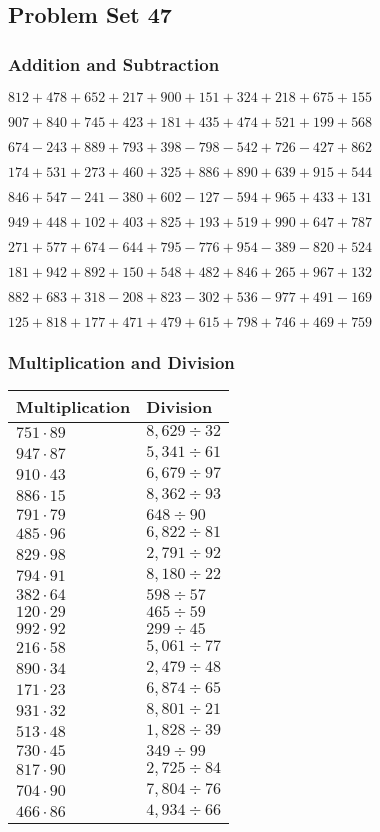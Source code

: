 \hypertarget{problem-set-47-1}{%
\subsection{Problem Set 47}\label{problem-set-47-1}}

\hypertarget{addition-and-subtraction-147}{%
\subsubsection{Addition and
Subtraction}\label{addition-and-subtraction-147}}

\(812 + 478 + 652 + 217 + 900 + 151 + 324 + 218 + 675 + 155\)

\(907 + 840 + 745 + 423 + 181 + 435 + 474 + 521 + 199 + 568\)

\(674 - 243 + 889 + 793 + 398 - 798 - 542 + 726 - 427 + 862\)

\(174 + 531 + 273 + 460 + 325 + 886 + 890 + 639 + 915 + 544\)

\(846 + 547 - 241 - 380 + 602 - 127 - 594 + 965 + 433 + 131\)

\(949 + 448 + 102 + 403 + 825 + 193 + 519 + 990 + 647 + 787\)

\(271 + 577 + 674 - 644 + 795 - 776 + 954 - 389 - 820 + 524\)

\(181 + 942 + 892 + 150 + 548 + 482 + 846 + 265 + 967 + 132\)

\(882 + 683 + 318 - 208 + 823 - 302 + 536 - 977 + 491 - 169\)

\(125 + 818 + 177 + 471 + 479 + 615 + 798 + 746 + 469 + 759\)

\hypertarget{multiplication-and-division-147}{%
\subsubsection{Multiplication and
Division}\label{multiplication-and-division-147}}

\begin{longtable}[]{@{}ll@{}}
\toprule
Multiplication & Division\tabularnewline
\midrule
\endhead
\(751 \cdot 89\) & \(8,629÷32\)\tabularnewline
\(947 \cdot 87\) & \(5,341÷61\)\tabularnewline
\(910 \cdot 43\) & \(6,679÷97\)\tabularnewline
\(886 \cdot 15\) & \(8,362÷93\)\tabularnewline
\(791 \cdot 79\) & \(648÷90\)\tabularnewline
\(485 \cdot 96\) & \(6,822÷81\)\tabularnewline
\(829 \cdot 98\) & \(2,791÷92\)\tabularnewline
\(794 \cdot 91\) & \(8,180÷22\)\tabularnewline
\(382 \cdot 64\) & \(598÷57\)\tabularnewline
\(120 \cdot 29\) & \(465÷59\)\tabularnewline
\(992 \cdot 92\) & \(299÷45\)\tabularnewline
\(216 \cdot 58\) & \(5,061÷77\)\tabularnewline
\(890 \cdot 34\) & \(2,479÷48\)\tabularnewline
\(171 \cdot 23\) & \(6,874÷65\)\tabularnewline
\(931 \cdot 32\) & \(8,801÷21\)\tabularnewline
\(513 \cdot 48\) & \(1,828÷39\)\tabularnewline
\(730 \cdot 45\) & \(349÷99\)\tabularnewline
\(817 \cdot 90\) & \(2,725÷84\)\tabularnewline
\(704 \cdot 90\) & \(7,804÷76\)\tabularnewline
\(466 \cdot 86\) & \(4,934÷66\)\tabularnewline
\bottomrule
\end{longtable}

